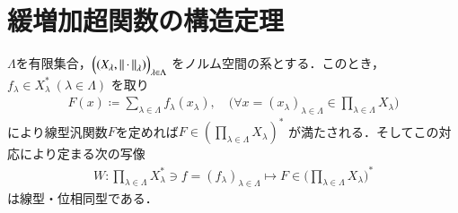 \section{緩増加超関数の構造定理}
	\begin{screen}
		\begin{lem}\label{lem:isomorphism_on_product_of_dual_spaces}
			$\Lambda$を有限集合，$\Bigl( (X_\lambda,\left\|\, \cdot\, \right\|_{\lambda}) \Bigr)_{\lambda \in \Lambda}$
			をノルム空間の系とする．このとき，$f_\lambda \in X^*_\lambda\ (\lambda \in \Lambda)$
			を取り
			\begin{align}
				F(x) \coloneqq \sum_{\lambda \in \Lambda} f_\lambda(x_\lambda),
				\quad \biggl(\forall x = (x_\lambda)_{\lambda \in \Lambda} \in \prod_{\lambda \in \Lambda} X_\lambda \biggr)
				\label{eq:lem_isomorphism_on_product_of_dual_spaces}
			\end{align}
			により線型汎関数$F$を定めれば$F \in \left( \prod_{\lambda \in \Lambda} X_\lambda \right)^*$
			が満たされる．そしてこの対応により定まる次の写像
			\begin{align}
				W:\prod_{\lambda \in \Lambda} X_\lambda^* \ni f = (f_\lambda)_{\lambda \in \Lambda}
				\longmapsto F \in \Biggl( \prod_{\lambda \in \Lambda} X_\lambda \Biggr)^*
			\end{align}
			は線型・位相同型である．
		\end{lem}
	\end{screen}
	
